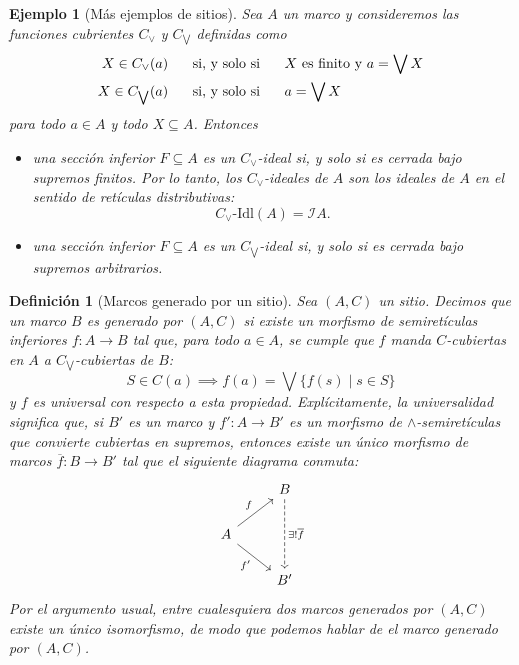 \documentclass[12pt,letterpaper,titlepage]{article}
\newtheorem*{defn}{Definición}
\newtheorem*{exa}{Ejemplo}
\theoremstyle{definition}
\renewcommand\sup{\vee}
\newcommand\Sup{\bigvee}
\newcommand\ol[1]{\overline{#1}}
\renewcommand\inf{\wedge}
\renewcommand\cal[1]{\mathcal{#1}}
\newcommand\ssi{\hspace{5mm}\text{ si, y solo si }\hspace{5mm}}
\newcommand\<{\langle}
\renewcommand\>{\rangle}
\newcommand\Idl{\text{-}\mathrm{Idl}}
\begin{document}
\begin{exa}[Más ejemplos de sitios]
    Sea $A$ un marco y consideremos las funciones cubrientes
    $C_\sup$ y $C_{\Sup}$ definidas como
    \begin{align*}
        X\in C_\sup(a)
        &\ssi
        \text{$X$ es finito y } a=\Sup X \\
        X\in C_{\Sup}(a)
        &\ssi
        a=\Sup X 
    \end{align*}
    para todo $a\in A$ y todo $X\subseteq A$.
    Entonces
    \begin{itemize}
        \item
        una sección inferior $F\subseteq A$ es un
        $C_\sup$-ideal si, y solo si es cerrada bajo supremos
        finitos.
        Por lo tanto, los $C_\sup$-ideales de $A$
        son los ideales de $A$ en el sentido de retículas
        distributivas:
        \[
            C_\sup\Idl(A) = \cal I A.
        \]
        \item
        una sección inferior $F\subseteq A$ es un
        $C_{\Sup}$-ideal si, y solo si es cerrada bajo supremos
        arbitrarios.
    \end{itemize}
\end{exa}

\begin{defn}[Marcos generado por un sitio]
    Sea $(A,C)$ un sitio.
    Decimos que un marco $B$ es generado por $(A,C)$
    si existe un morfismo de semiretículas inferiores
    $f:A\to B$ tal que, para todo $a\in A$, se cumple
    que $f$ manda $C$-cubiertas en $A$ a $C_{\Sup}$-cubiertas
    de $B$:
    \begin{equation*}
        S\in C(a) \implies f(a) = \Sup\{f(s)\mid s\in S\}
    \end{equation*}
    y $f$ es universal con respecto a esta propiedad.
    Explícitamente, la universalidad significa que,
    si $B'$ es un marco y $f':A\to B'$ es un morfismo
    de $\inf$-semiretículas
    que convierte cubiertas en supremos,
    entonces existe un único morfismo de marcos
    $\ol{f}:B\to B'$ tal que el siguiente diagrama conmuta:
    \[
        \begin{tikzcd}[ampersand replacement=\&]
            \& B \arrow[dd, "\exists!\overline{f}", dashed] \\
            A \arrow[ru, "f"] \arrow[rd, "f'"'] \& \\
            \& B'                                          
        \end{tikzcd}
    \]
    Por el argumento usual, entre cualesquiera dos
    marcos generados por $(A,C)$ existe un único isomorfismo,
    de modo que podemos hablar de \emph{el} marco generado
    por $(A,C)$.
\end{defn}
\end{document}
